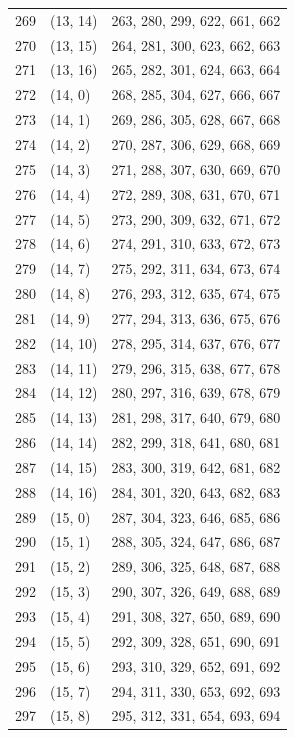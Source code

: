 \documentclass{article}
\begin{document}
\begin{longtable}{lll}
  269 & (13, 14) & 263, 280, 299, 622, 661, 662 \\
  270 & (13, 15) & 264, 281, 300, 623, 662, 663 \\
  271 & (13, 16) & 265, 282, 301, 624, 663, 664 \\
  272 & (14, 0) & 268, 285, 304, 627, 666, 667 \\
  273 & (14, 1) & 269, 286, 305, 628, 667, 668 \\
  274 & (14, 2) & 270, 287, 306, 629, 668, 669 \\
  275 & (14, 3) & 271, 288, 307, 630, 669, 670 \\
  276 & (14, 4) & 272, 289, 308, 631, 670, 671 \\
  277 & (14, 5) & 273, 290, 309, 632, 671, 672 \\
  278 & (14, 6) & 274, 291, 310, 633, 672, 673 \\
  279 & (14, 7) & 275, 292, 311, 634, 673, 674 \\
  280 & (14, 8) & 276, 293, 312, 635, 674, 675 \\
  281 & (14, 9) & 277, 294, 313, 636, 675, 676 \\
  282 & (14, 10) & 278, 295, 314, 637, 676, 677 \\
  283 & (14, 11) & 279, 296, 315, 638, 677, 678 \\
  284 & (14, 12) & 280, 297, 316, 639, 678, 679 \\
  285 & (14, 13) & 281, 298, 317, 640, 679, 680 \\
  286 & (14, 14) & 282, 299, 318, 641, 680, 681 \\
  287 & (14, 15) & 283, 300, 319, 642, 681, 682 \\
  288 & (14, 16) & 284, 301, 320, 643, 682, 683 \\
  289 & (15, 0) & 287, 304, 323, 646, 685, 686 \\
  290 & (15, 1) & 288, 305, 324, 647, 686, 687 \\
  291 & (15, 2) & 289, 306, 325, 648, 687, 688 \\
  292 & (15, 3) & 290, 307, 326, 649, 688, 689 \\
  293 & (15, 4) & 291, 308, 327, 650, 689, 690 \\
  294 & (15, 5) & 292, 309, 328, 651, 690, 691 \\
  295 & (15, 6) & 293, 310, 329, 652, 691, 692 \\
  296 & (15, 7) & 294, 311, 330, 653, 692, 693 \\
  297 & (15, 8) & 295, 312, 331, 654, 693, 694 \\

\end{longtable}
\end{document}
